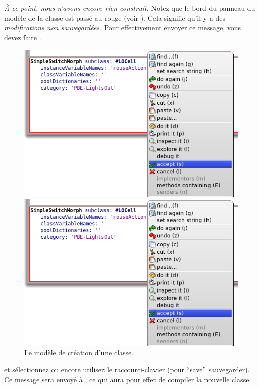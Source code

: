 \documentclass[a4paper,10pt,twoside]{book}
\begin{document}
\emph{À ce point, nous n'avons encore rien construit.}
Notez que le bord du panneau du modèle de la classe est passé au rouge
(voir ).
Cela signifie qu'il y a des \emph{modifications non sauvegardées}.
Pour effectivement envoyer ce message, vous devez faire .

\begin{figure}[h!t]
\ifluluelse
	{\centerline {\includegraphics[width=\textwidth]{AcceptClassDef}}}
	{\centerline {\includegraphics[scale=0.7]{AcceptClassDef}}}
\caption{Le modèle de création d'une classe.
}
\end{figure}

\Actclickz{} et sélectionnez  ou encore utilisez le
raccourci-clavier  (pour ``save'' 
\cad sauvegarder).
Ce message sera envoyé à , ce qui aura pour
effet de compiler la nouvelle classe.
\end{document}
